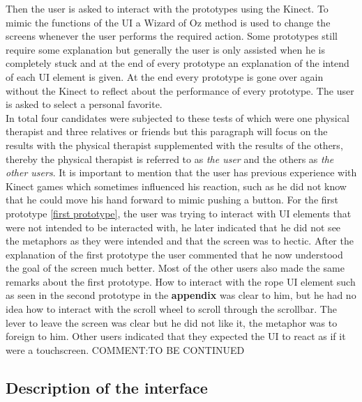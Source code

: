 Then the user is asked to interact with the prototypes using the Kinect. To mimic the functions of the UI a Wizard of Oz method is used to change the screens whenever the user performs the required action. Some prototypes still require some explanation but generally the user is only assisted when he is completely stuck and at the end of every prototype an explanation of the intend of each UI element is given. At the end every prototype is gone over again without the Kinect to reflect about the performance of every prototype. The user is asked to select a personal favorite.\\

In total four candidates were subjected to these tests of which were one physical therapist and three relatives or friends but this paragraph will focus on the results with the physical therapist supplemented with the results of the others, thereby the physical therapist is referred to as \emph{the user} and the others as \emph{the other users}. It is important to mention that the user has previous experience with Kinect games which sometimes influenced his reaction, such as he did not know that he could move his hand forward to mimic pushing a button. For the first prototype  \ref{first prototype}, the user was trying to interact with UI elements that were not intended to be interacted with, he later indicated that he did not see the metaphors as they were intended and that the screen was to hectic. After the explanation of the first prototype the user commented that he now understood the goal of the screen much better. Most of the other users also made the same remarks about the first prototype. How to interact with the rope UI element such as seen in the second prototype in the \textbf{appendix} was clear to him, but he had no idea how to interact with the scroll wheel to scroll through the scrollbar. The lever to leave the screen was clear but he did not like it, the metaphor was to foreign to him. Other users indicated that they expected the UI to react as if it were a touchscreen. 
{\large COMMENT:TO BE CONTINUED}









\subsection{Description of the interface}


